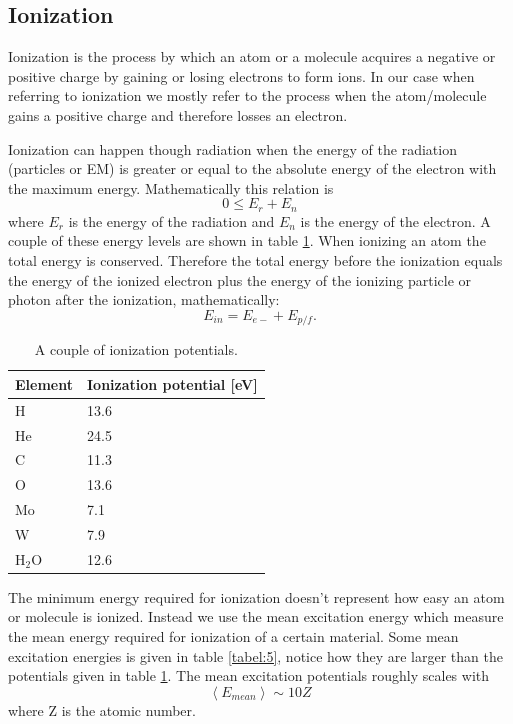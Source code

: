 \documentclass[jmp, amsmath, amssymb, reprint]{article}
\numberwithin{equation}{section}
\begin{document}
\begin{multicols}{2}
\subsection{Ionization}

Ionization is the process by which an atom or a molecule acquires a negative or positive charge by gaining or losing electrons to form ions. In our case when referring to ionization we mostly refer to the process when the atom/molecule gains a positive charge and therefore losses an electron.

Ionization can happen though radiation when the energy of the radiation (particles or EM) is greater or equal to the absolute energy of the electron with the maximum energy. Mathematically this relation is
\begin{equation}
0 \leq E_r + E_n
\end{equation}
where \(E_r\) is the energy of the radiation and \(E_n\) is the energy of the electron. A couple of these energy levels are shown in table \ref{tabel:4}. When ionizing an atom the total energy is conserved. Therefore the total energy before the ionization equals the energy of the ionized electron plus the energy of the ionizing particle or photon after the ionization, mathematically:
\begin{equation}
E_{in} = E_{e-} + E_{p/f}.
\end{equation}


\begin{table}[H]
  \begin{center}
    \begin{tabular}{| l | l |}
   	\hline
	Element & Ionization potential [eV]\\ \hline
	H & 13.6\\
	He & 24.5\\
	C & 11.3\\
	O & 13.6\\
	Mo & 7.1\\
	W & 7.9\\
	H\(_2\)O & 12.6\\ \hline
	\end{tabular}
    \caption{A couple of ionization potentials.}
    \label{tabel:4}
  \end{center}
\end{table}

The minimum energy required for ionization doesn't represent how easy an atom or molecule is ionized. Instead we use the mean excitation energy which measure the mean energy required for ionization of a certain material. Some mean excitation energies is given in table \ref{tabel:5}, notice how they are larger than the potentials given in table \ref{tabel:4}. The mean excitation potentials roughly scales with
\begin{equation}
\left<E_{mean}\right>\sim 10Z
\end{equation}
where Z is the atomic number.


\end{multicols}
\end{document}

